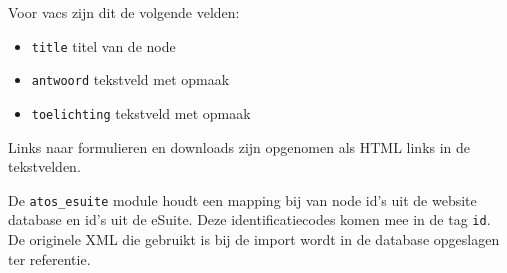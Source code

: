 Voor vacs zijn dit de volgende velden:
\begin{itemize}
\item \texttt{title} titel van de node
\item \texttt{antwoord} tekstveld met opmaak
\item \texttt{toelichting} tekstveld met opmaak
\end{itemize}

Links naar formulieren en downloads zijn opgenomen als HTML links in de tekstvelden.

De \texttt{atos\_esuite} module houdt een mapping bij van node id's uit de website database en id's uit de eSuite. Deze identificatiecodes komen mee in de tag \texttt{id}. De originele XML die gebruikt is bij de import wordt in de database opgeslagen ter referentie.

